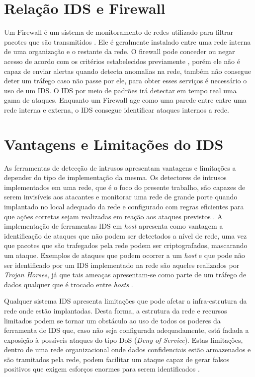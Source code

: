 	\section{Relação IDS e Firewall}
	\label{sec:IDS_Firewall}

	Um Firewall é um sistema de monitoramento de redes utilizado para filtrar pacotes que são transmitidos . Ele é geralmente instalado entre uma rede interna de uma organização e o restante da rede. O firewall pode conceder ou negar acesso de acordo com os critérios estabelecidos previamente \cite{Morais}, porém ele não é capaz de enviar alertas quando detecta anomalias na rede, também não consegue deter um tráfego caso não passe por ele, para obter esses serviços é necessário o uso de um IDS. O IDS por meio de padrões irá detectar em tempo real uma gama de ataques. Enquanto um Firewall age como uma parede entre entre uma rede interna e externa, o IDS consegue identificar ataques internos a rede.

	\section{Vantagens e Limitações do IDS}
	\label{sec:IDS_VeL}

	As ferramentas de detecção de intrusos apresentam vantagens e limitações a depender do tipo de implementação da mesma. Os detectores de intrusos implementados em uma rede, que é o foco do presente trabalho, são capazes de serem invisíveis aos atacantes e monitorar uma rede de grande porte quando implantado no local adequado da rede e configurado com regras eficientes para que ações corretas sejam realizadas em reação aos ataques previstos \cite{Comunidade_Snort_Brasil}.
	A implementação de ferramentas IDS em \textit{host} apresenta como vantagem a identificação de ataques que não podem ser detectados a nível de rede, uma vez que pacotes que são trafegados pela rede podem ser criptografados, mascarando um ataque. Exemplos de ataques que podem ocorrer a um \textit{host} e que pode não ser identificado por um IDS implementado na rede são aqueles realizados por \textit{Trojan Horses}, já que tais ameaças apresentam-se como parte de um tráfego de dados qualquer que é trocado entre \textit{hosts} \cite{Comunidade_Snort_Brasil}.
		
	Qualquer sistema IDS apresenta limitações que pode afetar a infra-estrutura da rede onde estão implantadas. Desta forma, a estrutura da rede e recursos limitados podem se tornar um obstáculo ao uso de todos os poderes da ferramenta de IDS que, caso não seja configurada adequadamente, está fadada a exposição à possíveis ataques do tipo DoS (\textit{Deny of Service}). Estas limitações, dentro de uma rede organizacional onde dados confidenciais estão armazenados e são tramitados pela rede, podem facilitar um ataque capaz de gerar falsos positivos que exigem esforços enormes para serem identificados \cite{Morais}.

